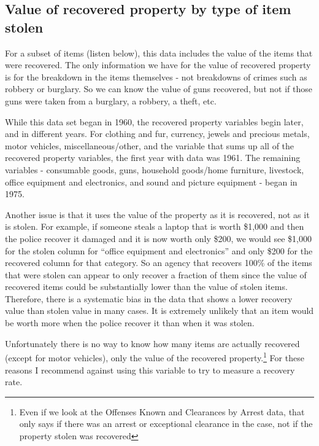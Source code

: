 \documentclass[
]{krantz}
\begin{document}
\subsection{Value of recovered property by type of item
stolen}\label{value-of-recovered-property-by-type-of-item-stolen}

For a subset of items (listen below), this data includes the
value of the items that were recovered. The only information
we have for the value of recovered property is for the
breakdown in the items themselves - not breakdowns of crimes
such as robbery or burglary. So we can know the value of
guns recovered, but not if those guns were taken from a
burglary, a robbery, a theft, etc.

While this data set began in 1960, the recovered property
variables begin later, and in different years. For clothing
and fur, currency, jewels and precious metals, motor
vehicles, miscellaneous/other, and the variable that sums up
all of the recovered property variables, the first year with
data was 1961. The remaining variables - consumable goods,
guns, household goods/home furniture, livestock, office
equipment and electronics, and sound and picture equipment -
began in 1975.

Another issue is that it uses the value of the property as
it is recovered, not as it is stolen. For example, if
someone steals a laptop that is worth \$1,000 and then the
police recover it damaged and it is now worth only \$200, we
would see \$1,000 for the stolen column for ``office
equipment and electronics'' and only \$200 for the recovered
column for that category. So an agency that recovers 100\%
of the items that were stolen can appear to only recover a
fraction of them since the value of recovered items could be
substantially lower than the value of stolen items.
Therefore, there is a systematic bias in the data that shows
a lower recovery value than stolen value in many cases. It
is extremely unlikely that an item would be worth more when
the police recover it than when it was stolen.

Unfortunately there is no way to know how many items are
actually recovered (except for motor vehicles), only the
value of the recovered property.\footnote{Even if we look at
  the Offenses Known and Clearances by Arrest data, that
  only says if there was an arrest or exceptional clearance
  in the case, not if the property stolen was recovered} For
these reasons I recommend against using this variable to try
to measure a recovery rate.
\end{document}
